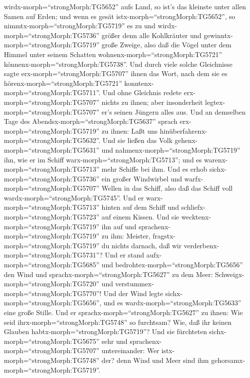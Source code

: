 wirdx-morph=``strongMorph:TG5652'' aufs Land, so ist's das kleinste
unter allen Samen auf Erden;  und wenn es gesät
istx-morph=``strongMorph:TG5652'', so
nimmtx-morph=``strongMorph:TG5719'' es zu und
wirdx-morph=``strongMorph:TG5736'' größer denn alle Kohlkräuter und
gewinntx-morph=``strongMorph:TG5719'' große Zweige, also daß die Vögel
unter dem Himmel unter seinem Schatten
wohnenx-morph=``strongMorph:TG5721''
könnenx-morph=``strongMorph:TG5738''.  Und durch viele
solche Gleichnisse sagte erx-morph=``strongMorph:TG5707'' ihnen das
Wort, nach dem sie es hörenx-morph=``strongMorph:TG5721''
konntenx-morph=``strongMorph:TG5711''.  Und ohne Gleichnis
redete erx-morph=``strongMorph:TG5707'' nichts zu ihnen; aber
insonderheit legtex-morph=``strongMorph:TG5707'' er's seinen Jüngern
alles aus.  Und an demselben Tage des
Abendsx-morph=``strongMorph:TG5637'' sprach
erx-morph=``strongMorph:TG5719'' zu ihnen: Laßt uns
hinüberfahrenx-morph=``strongMorph:TG5632''.  Und sie
ließen das Volk gehenx-morph=``strongMorph:TG5631'' und
nahmenx-morph=``strongMorph:TG5719'' ihn, wie er im Schiff
warx-morph=``strongMorph:TG5713''; und es
warenx-morph=``strongMorph:TG5713'' mehr Schiffe bei ihm. 
Und es erhob sichx-morph=``strongMorph:TG5736'' ein großer Windwirbel
und warfx-morph=``strongMorph:TG5707'' Wellen in das Schiff, also daß
das Schiff voll wardx-morph=``strongMorph:TG5745''.  Und er
warx-morph=``strongMorph:TG5713'' hinten auf dem Schiff und
schliefx-morph=``strongMorph:TG5723'' auf einem Kissen. Und sie
wecktenx-morph=``strongMorph:TG5719'' ihn auf und
sprachenx-morph=``strongMorph:TG5719'' zu ihm: Meister,
fragstx-morph=``strongMorph:TG5719'' du nichts darnach, daß wir
verderbenx-morph=``strongMorph:TG5731''?  Und er stand
aufx-morph=``strongMorph:TG5685'' und
bedrohtex-morph=``strongMorph:TG5656'' den Wind und
sprachx-morph=``strongMorph:TG5627'' zu dem Meer:
Schweigx-morph=``strongMorph:TG5720'' und
verstummex-morph=``strongMorph:TG5770''! Und der Wind legte
sichx-morph=``strongMorph:TG5656'', und es
wardx-morph=``strongMorph:TG5633'' eine große Stille.  Und
er sprachx-morph=``strongMorph:TG5627'' zu ihnen: Wie seid
ihrx-morph=``strongMorph:TG5748'' so furchtsam? Wie, daß ihr keinen
Glauben habtx-morph=``strongMorph:TG5719''?  Und sie
fürchteten sichx-morph=``strongMorph:TG5675'' sehr und
sprachenx-morph=``strongMorph:TG5707'' untereinander: Wer
istx-morph=``strongMorph:TG5748'' der? denn Wind und Meer sind ihm
gehorsamx-morph=``strongMorph:TG5719''.

